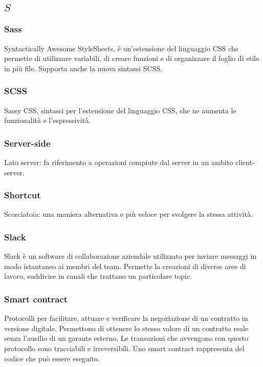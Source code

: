 \subsection*{\quad$S\quad$}
\subsubsection*{Sass}
Syntactically Awesome StyleSheets, è un'estensione del linguaggio CSS che permette di utilizzare variabili, di creare funzioni e di organizzare il foglio di stile in più file. Supporta anche la nuova sintassi SCSS\glo.

\subsubsection*{SCSS}
Sassy CSS, sintassi per l'estensione del linguaggio CSS, che ne aumenta le funzionalità e l'espressività.

\subsubsection*{Server-side}
Lato server: fa riferimento a operazioni compiute dal server in un ambito client-server. 

\subsubsection*{Shortcut}
Scorciatoia: una maniera alternativa e più veloce per svolgere la stessa attività.


\subsubsection*{Slack}
Slack è un software di collaborazione aziendale utilizzato per inviare messaggi in modo istantaneo ai membri del team. Permette la creazioni di diverse aree di lavoro, suddivise in canali che trattano un particolare topic.

\subsubsection*{Smart contract}
Protocolli per facilitare, attuare e verificare la negoziazione di un contratto in versione digitale. Permettono di ottenere lo stesso valore di un contratto reale senza l'ausilio di un garante esterno. Le transazioni che avvengono con questo protocollo sono tracciabili e irreversibili. Uno smart contract rappresenta del codice che può essere eseguito.

